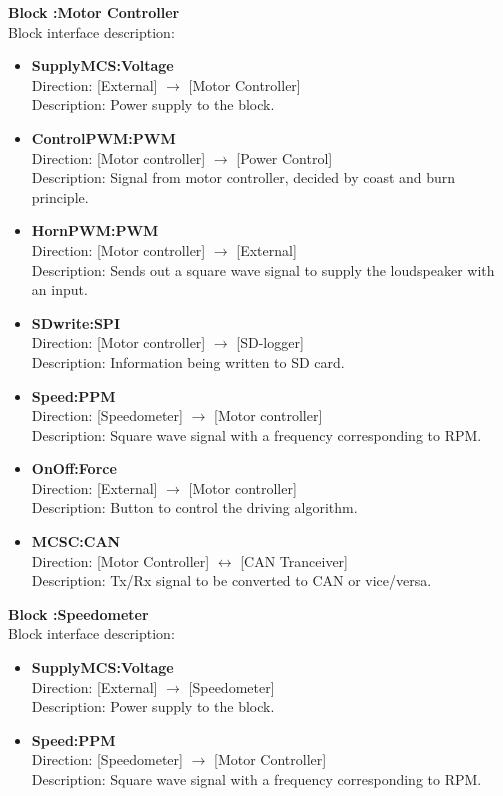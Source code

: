 \textbf{Block :Motor Controller}\\
Block interface description:
\begin{itemize}
	\item \textbf{SupplyMCS:Voltage}\\
	Direction: [External] $\rightarrow$ [Motor Controller]\\
	Description: Power supply to the block.
	\item \textbf{ControlPWM:PWM}\\
	Direction: [Motor controller] $\rightarrow$ [Power Control]\\
	Description: Signal from motor controller, decided by  coast and burn principle. 
	\item \textbf{HornPWM:PWM}\\
	Direction: [Motor controller] $\rightarrow$ [External]\\
	Description: Sends out a square wave signal to supply the loudspeaker with an input.
	\item \textbf{SDwrite:SPI}\\
	Direction: [Motor controller] $\rightarrow$ [SD-logger]\\
	Description: Information being written to SD card.
	\item \textbf{Speed:PPM}\\
	Direction: [Speedometer] $\rightarrow$ [Motor controller]\\
	Description: Square wave signal with a frequency corresponding to RPM.
	\item \textbf{OnOff:Force}\\
	Direction: [External] $\rightarrow$ [Motor controller]\\
	Description: Button to control the driving algorithm.
	\item \textbf{MCSC:CAN}\\
	Direction: [Motor Controller] $\leftrightarrow$ [CAN Tranceiver]\\
	Description: Tx/Rx signal to be converted to CAN or vice/versa.
\end{itemize}

\textbf{Block :Speedometer}\\
Block interface description:
\begin{itemize}
	\item \textbf{SupplyMCS:Voltage}\\
	Direction: [External] $\rightarrow$ [Speedometer]\\
	Description: Power supply to the block.
	\item \textbf{Speed:PPM}\\
	Direction: [Speedometer] $\rightarrow$ [Motor Controller]\\
	Description: Square wave signal with a frequency corresponding to RPM.
\end{itemize}

